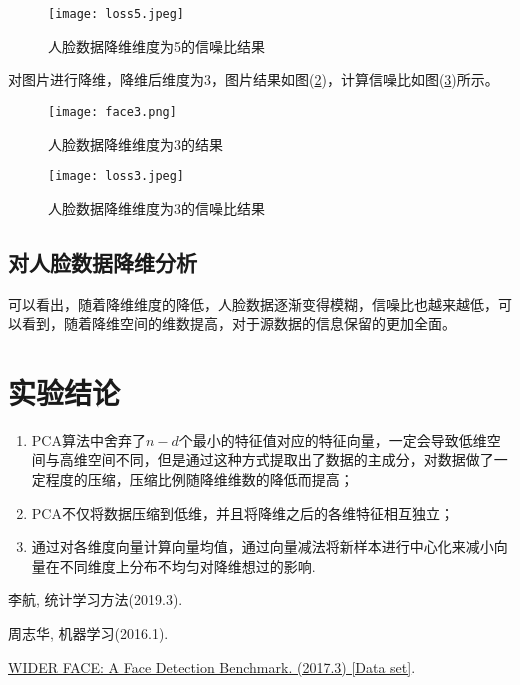 \documentclass{hitreport}
\begin{document}
\begin{figure}[htb]
	\centering
	\texttt{[image: loss5.jpeg]}
	\caption{人脸数据降维维度为5的信噪比结果}
	\label{fig:loss5}
\end{figure}


对图片进行降维，降维后维度为3，图片结果如图(\ref{fig:face3})，计算信噪比如图(\ref{fig:loss3})所示。

\begin{figure}[htb]
	\centering
	\texttt{[image: face3.png]}
	\caption{人脸数据降维维度为3的结果}
	\label{fig:face3}
\end{figure}

\begin{figure}[htb]
	\centering
	\texttt{[image: loss3.jpeg]}
	\caption{人脸数据降维维度为3的信噪比结果}
	\label{fig:loss3}
\end{figure}

\subsection{对人脸数据降维分析}

可以看出，随着降维维度的降低，人脸数据逐渐变得模糊，信噪比也越来越低，可以看到，随着降维空间的维数提高，对于源数据的信息保留的更加全面。

\section{实验结论}

\begin{enumerate}
\item PCA算法中舍弃了$n-d$个最小的特征值对应的特征向量，一定会导致低维空间与高维空间不同，但是通过这种方式提取出了数据的主成分，对数据做了一定程度的压缩，压缩比例随降维维数的降低而提高；
\item PCA不仅将数据压缩到低维，并且将降维之后的各维特征相互独立；
\item 通过对各维度向量计算向量均值，通过向量减法将新样本进行中心化来减小向量在不同维度上分布不均匀对降维想过的影响.
\end{enumerate}

\renewcommand\refname{参考文献}
 
\begin{thebibliography}{2}
李航, 统计学习方法(2019.3).

周志华, 机器学习(2016.1).

\href{http://shuoyang1213.me/WIDERFACE}{WIDER FACE: A Face Detection Benchmark. (2017.3) [Data set]}.
\end{thebibliography}
\end{document}
